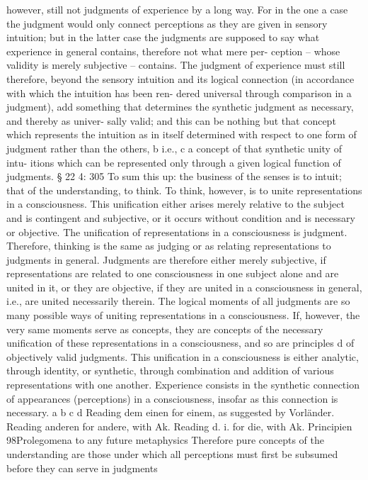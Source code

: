 however, still not judgments of experience by a long way. For in the one a
case the judgment would only connect perceptions as they are given in
sensory intuition; but in the latter case the judgments are supposed to
say what experience in general contains, therefore not what mere per-
ception – whose validity is merely subjective – contains. The judgment
of experience must still therefore, beyond the sensory intuition and its
logical connection (in accordance with which the intuition has been ren-
dered universal through comparison in a judgment), add something that
determines the synthetic judgment as necessary, and thereby as univer-
sally valid; and this can be nothing but that concept which represents the
intuition as in itself determined with respect to one form of judgment
rather than the others, b i.e., c a concept of that synthetic unity of intu-
itions which can be represented only through a given logical function of
judgments.
§ 22
4: 305
To sum this up: the business of the senses is to intuit; that of the
understanding, to think. To think, however, is to unite representations
in a consciousness. This uniﬁcation either arises merely relative to the
subject and is contingent and subjective, or it occurs without condition
and is necessary or objective. The uniﬁcation of representations in a
consciousness is judgment. Therefore, thinking is the same as judging
or as relating representations to judgments in general. Judgments are
therefore either merely subjective, if representations are related to
one consciousness in one subject alone and are united in it, or they
are objective, if they are united in a consciousness in general, i.e., are
united necessarily therein. The logical moments of all judgments are
so many possible ways of uniting representations in a consciousness. If,
however, the very same moments serve as concepts, they are concepts
of the necessary uniﬁcation of these representations in a consciousness,
and so are principles d of objectively valid judgments. This uniﬁcation
in a consciousness is either analytic, through identity, or synthetic,
through combination and addition of various representations with one
another. Experience consists in the synthetic connection of appearances
(perceptions) in a consciousness, insofar as this connection is necessary.
a
b
c
d
Reading dem einen for einem, as suggested by Vorländer.
Reading anderen for andere, with Ak.
Reading d. i. for die, with Ak.
Principien
98Prolegomena to any future metaphysics
Therefore pure concepts of the understanding are those under which all
perceptions must ﬁrst be subsumed before they can serve in judgments
